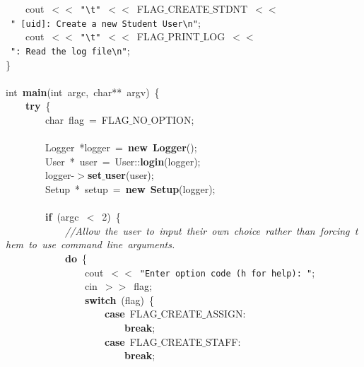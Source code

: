 \mbox{}\ \ \ \ cout\ $<$$<$\ \texttt{"{}}\texttt{\textbackslash{}t}\texttt{"{}}\ $<$$<$\ FLAG$\_$CREATE$\_$STDNT\ $<$$<$\ \texttt{"{}\ [uid]:\ Create\ a\ new\ Student\ User}\texttt{\textbackslash{}n}\texttt{"{}}; \\
\mbox{}\ \ \ \ cout\ $<$$<$\ \texttt{"{}}\texttt{\textbackslash{}t}\texttt{"{}}\ $<$$<$\ FLAG$\_$PRINT$\_$LOG\ $<$$<$\ \texttt{"{}:\ Read\ the\ log\ file}\texttt{\textbackslash{}n}\texttt{"{}}; \\
\mbox{}\} \\
\mbox{} \\
\mbox{}int\ \textbf{main}(int\ argc,\ char**\ argv)\ \{ \\
\mbox{}\ \ \ \ \textbf{try}\ \{ \\
\mbox{}\ \ \ \ \ \ \ \ char\ flag\ =\ FLAG$\_$NO$\_$OPTION; \\
\mbox{} \\
\mbox{}\ \ \ \ \ \ \ \ Logger\ *logger\ =\ \textbf{new}\ \textbf{Logger}(); \\
\mbox{}\ \ \ \ \ \ \ \ User\ *\ user\ =\ User::\textbf{login}(logger); \\
\mbox{}\ \ \ \ \ \ \ \ logger-$>$\textbf{set$\_$user}(user); \\
\mbox{}\ \ \ \ \ \ \ \ Setup\ *\ setup\ =\ \textbf{new}\ \textbf{Setup}(logger); \\
\mbox{} \\
\mbox{}\ \ \ \ \ \ \ \ \textbf{if}\ (argc\ $<$\ 2)\ \{ \\
\mbox{}\ \ \ \ \ \ \ \ \ \ \ \ \textit{//Allow\ the\ user\ to\ input\ their\ own\ choice\ rather\ than\ forcing\ them\ to\ use\ command\ line\ arguments.} \\
\mbox{}\ \ \ \ \ \ \ \ \ \ \ \ \textbf{do}\ \{ \\
\mbox{}\ \ \ \ \ \ \ \ \ \ \ \ \ \ \ \ cout\ $<$$<$\ \texttt{"{}Enter\ option\ code\ (h\ for\ help):\ "{}}; \\
\mbox{}\ \ \ \ \ \ \ \ \ \ \ \ \ \ \ \ cin\ $>$$>$\ flag; \\
\mbox{}\ \ \ \ \ \ \ \ \ \ \ \ \ \ \ \ \textbf{switch}\ (flag)\ \{ \\
\mbox{}\ \ \ \ \ \ \ \ \ \ \ \ \ \ \ \ \ \ \ \ \textbf{case}\ FLAG$\_$CREATE$\_$ASSIGN: \\
\mbox{}\ \ \ \ \ \ \ \ \ \ \ \ \ \ \ \ \ \ \ \ \ \ \ \ \textbf{break}; \\
\mbox{}\ \ \ \ \ \ \ \ \ \ \ \ \ \ \ \ \ \ \ \ \textbf{case}\ FLAG$\_$CREATE$\_$STAFF: \\
\mbox{}\ \ \ \ \ \ \ \ \ \ \ \ \ \ \ \ \ \ \ \ \ \ \ \ \textbf{break}; \\
